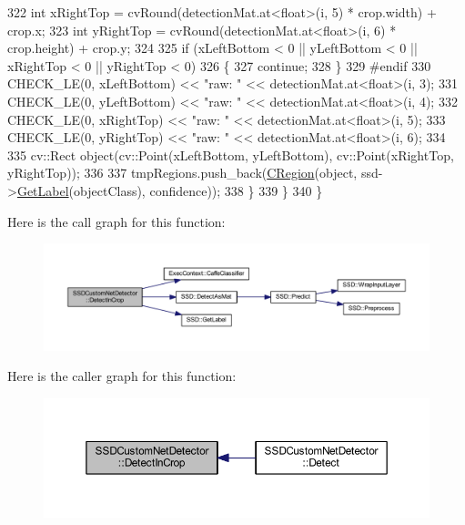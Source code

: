 \begin{DoxyCode}
322             \textcolor{keywordtype}{int} xRightTop = cvRound(detectionMat.at<\textcolor{keywordtype}{float}>(i, 5) * crop.width) + crop.x;
323             \textcolor{keywordtype}{int} yRightTop = cvRound(detectionMat.at<\textcolor{keywordtype}{float}>(i, 6) * crop.height) + crop.y;
324 
325             \textcolor{keywordflow}{if} (xLeftBottom < 0 || yLeftBottom < 0 || xRightTop < 0 || yRightTop < 0)
326             \{
327                 \textcolor{keywordflow}{continue};
328             \}
329 \textcolor{preprocessor}{#endif}
330             CHECK\_LE(0, xLeftBottom) << \textcolor{stringliteral}{"raw: "} << detectionMat.at<\textcolor{keywordtype}{float}>(i, 3);
331             CHECK\_LE(0, yLeftBottom) << \textcolor{stringliteral}{"raw: "} << detectionMat.at<\textcolor{keywordtype}{float}>(i, 4);
332             CHECK\_LE(0, xRightTop) << \textcolor{stringliteral}{"raw: "} << detectionMat.at<\textcolor{keywordtype}{float}>(i, 5);
333             CHECK\_LE(0, yRightTop) << \textcolor{stringliteral}{"raw: "} << detectionMat.at<\textcolor{keywordtype}{float}>(i, 6);
334 
335             cv::Rect object(cv::Point(xLeftBottom, yLeftBottom), cv::Point(xRightTop, yRightTop));
336 
337             tmpRegions.push\_back(\mbox{\hyperlink{class_c_region}{CRegion}}(\textcolor{keywordtype}{object}, ssd->\mbox{\hyperlink{class_s_s_d_ac5c69f839f08bfa37dd33a66331f6fa3}{GetLabel}}(objectClass), confidence));
338         \}
339     \}
340 \}
\end{DoxyCode}
Here is the call graph for this function\+:\nopagebreak
\begin{figure}[H]
\begin{center}
\leavevmode
\includegraphics[width=350pt]{class_s_s_d_custom_net_detector_a9e87debb1ee3634724914830d6c2079d_cgraph}
\end{center}
\end{figure}
Here is the caller graph for this function\+:\nopagebreak
\begin{figure}[H]
\begin{center}
\leavevmode
\includegraphics[width=350pt]{class_s_s_d_custom_net_detector_a9e87debb1ee3634724914830d6c2079d_icgraph}
\end{center}
\end{figure}
